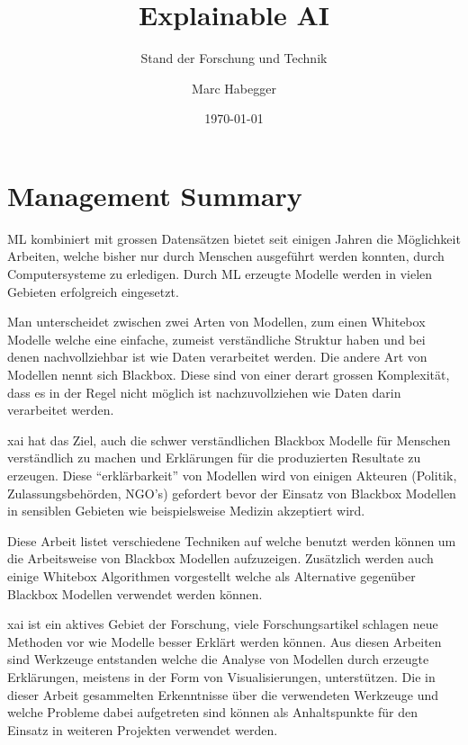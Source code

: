 \documentclass[
  12pt, %
  a4paper, %
  oneside, %
  openany, 
  numbers=noenddot, %
  BCOR=5mm, %
  parskip=half*, %
  thesis, %
]{bfhbook}
\author{Marc Habegger}
\title{Explainable AI}
\subtitle{Stand der Forschung und Technik}
\date{\today} %
\begin{document}
                         
\maketitle

\tableofcontents
\sloppy
\mainmatter %

\RaggedRight

\chapter{Management Summary}
\Gls{ML} kombiniert mit grossen Datensätzen bietet seit einigen Jahren die Möglichkeit Arbeiten, welche bisher nur durch Menschen ausgeführt werden konnten, durch Computersysteme zu erledigen. Durch \Gls{ML} erzeugte Modelle werden in vielen Gebieten erfolgreich eingesetzt. 

Man unterscheidet zwischen zwei Arten von Modellen, zum einen Whitebox Modelle welche eine einfache, zumeist verständliche Struktur haben und bei denen nachvollziehbar ist wie Daten verarbeitet werden. Die andere Art von Modellen nennt sich Blackbox. Diese sind von einer derart grossen Komplexität, dass es in der Regel nicht möglich ist nachzuvollziehen wie Daten darin verarbeitet werden. 

\Gls{xai} hat das Ziel, auch die schwer verständlichen Blackbox Modelle für Menschen verständlich zu machen und Erklärungen für die produzierten Resultate zu erzeugen. Diese ``erklärbarkeit'' von Modellen wird von einigen Akteuren (Politik, Zulassungsbehörden, NGO's) gefordert bevor der Einsatz von Blackbox Modellen in sensiblen Gebieten wie beispielsweise Medizin akzeptiert wird. 

Diese Arbeit listet verschiedene Techniken auf welche benutzt werden können um die Arbeitsweise von Blackbox Modellen aufzuzeigen.
Zusätzlich werden auch einige Whitebox Algorithmen vorgestellt welche als Alternative gegenüber Blackbox Modellen verwendet werden können.

\Gls{xai} ist ein aktives Gebiet der Forschung, viele Forschungsartikel schlagen neue Methoden vor wie Modelle besser Erklärt werden können. Aus diesen Arbeiten sind Werkzeuge entstanden welche die Analyse von Modellen durch erzeugte Erklärungen, meistens in der Form von Visualisierungen, unterstützen. Die in dieser Arbeit gesammelten Erkenntnisse über die verwendeten Werkzeuge und welche Probleme dabei aufgetreten sind können als Anhaltspunkte für den Einsatz in weiteren Projekten verwendet werden.
\end{document}
